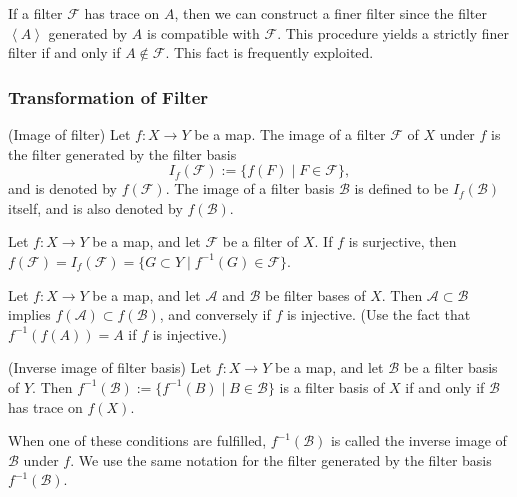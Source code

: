 \documentclass{report}
\begin{document}
\begin{rem}\label{rem trace}
    If a filter \( \mathscr{F} \) has trace on \( A \), then we can construct a finer filter since the filter \( \left< A \right> \) generated by \( A \) is compatible with \( \mathscr{F} \). This procedure yields a strictly finer filter if and only if \( A \notin \mathscr{F}\). This fact is frequently exploited.
\end{rem}

\subsubsection{Transformation of Filter}

\begin{dfn} (Image of filter)
    Let \( f:X \to Y \) be a map.
    The image of a filter \( \mathscr{F} \) of \( X \) under \( f \) is the filter generated by the filter basis
    \begin{equation*}
        I_f(\mathscr{F}):=\{f(F) \mid F \in \mathscr{F}\},
    \end{equation*}
    and is denoted by \( f(\mathscr{F}) \). The image of a filter basis \( \mathscr{B} \) is defined to be \( I_f(\mathscr{B}) \) itself, and is also denoted by \( f(\mathscr{B}) \).
\end{dfn}

\begin{exe}
    Let \( f:X \to Y \) be a map, and let \( \mathscr{F} \) be a filter of \( X \). If \( f \) is surjective, then \( f(\mathscr{F}) = I_f(\mathscr{F}) = \{G \subset Y \mid f^{-1}(G) \in \mathscr{F}\} \).
\end{exe}

\begin{exe}
    Let \( f:X \to Y \) be a map, and let \( \mathscr{A} \) and \( \mathscr{B} \) be filter bases of \( X \). Then \( \mathscr{A} \subset \mathscr{B} \) implies \( f(\mathscr{A}) \subset f(\mathscr{B}) \), and conversely if \( f \) is injective. (Use the fact that \( f^{-1}(f(A)) =A \) if \( f \) is injective.)
\end{exe}

\begin{exe}\label{inverse image of filter} (Inverse image of filter basis)
    Let \( f:X \to Y \) be a map, and let \( \mathscr{B} \) be a filter basis of \( Y \). Then \( f^{-1}(\mathscr{B}):=\{f^{-1}(B) \mid B \in \mathscr{B}\} \) is a filter basis of \( X \) if and only if \( \mathscr{B} \) has trace on \( f(X) \).

    When one of these conditions are fulfilled, \( f^{-1}(\mathscr{B}) \) is called the inverse image of \( \mathscr{B} \) under \( f \). We  use the same notation for the filter generated by the filter basis \( f^{-1}(\mathscr{B}) \).
\end{exe}
\end{document}
